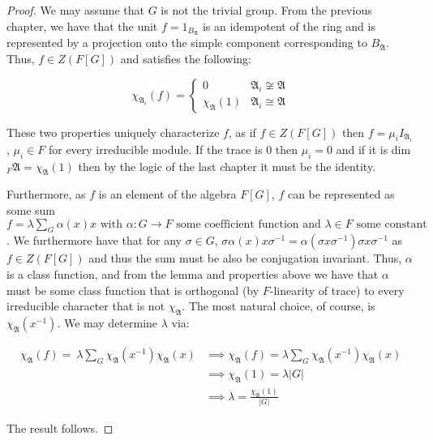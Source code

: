 \documentclass{article}
\begin{document}
\begin{proof}

  We may assume that $G$ is not the trivial group. From the previous chapter, we have that the unit $f = 1_{B_{\mathfrak{A}}}$ is an idempotent of the ring and is represented by a projection onto the simple component corresponding to $B_\mathfrak{A}$. Thus, $f \in Z(F[G])$ and satisfies the following:
  
  \[
    \chi_{\mathfrak{A}_{i}}(f) = \begin{cases} 0 & \mathfrak{A}_{i} \not\cong \mathfrak{A} \\ \chi_{\mathfrak{A}}(1) & \mathfrak{A}_{i} \cong \mathfrak{A} \end{cases}
  \]

  These two properties uniquely characterize $f$, as if $f \in Z(F[G])$ then $f = \mu_{i} I_{\mathfrak{A}_{i}}$, $\mu_{i} \in F$ for every irreducible module. If the trace is 0 then $\mu_{i}= 0$ and if it is dim$_{F}\mathfrak{A} = \chi_{\mathfrak{A}}(1)$ then by the logic of the last chapter it must be the identity.

  Furthermore, as $f$ is an element of the algebra $F[G]$, $f$ can be represented as some sum $ f = \lambda \sum_{G}\alpha(x)x \text{ with } \alpha: G \to F\text{ some coefficient function and } \lambda \in F\text{ some constant}$. We furthermore have that for any $\sigma \in G$, $\sigma \alpha(x)x \sigma^{-1} = \alpha(\sigma x \sigma^{-1}) \sigma x \sigma^{-1}$ as $f \in Z(F[G])$ and thus the sum must be also be conjugation invariant. Thus, $\alpha$ is a class function, and from the lemma and properties above we have that $\alpha$ must be some class function that is orthogonal (by $F$-linearity of trace) to every irreducible character that is not $\chi_{\mathfrak{A}}$. The most natural choice, of course, is $\chi_{\mathfrak{A}}(x^{-1})$.  We may determine $\lambda$ via:

  \begin{align*} \chi_{\mathfrak{A}}(f)  = \  \lambda \sum_{G} \chi_{\mathfrak{A}}(x^{-1})\chi_{\mathfrak{A}}(x) & \implies \chi_{\mathfrak{A}}(f)  =   \lambda \sum_{G} \chi_{\mathfrak{A}}(x^{-1})\chi_{\mathfrak{A}}(x) \\
  &\implies  \chi_{\mathfrak{A}}(1)  =   \lambda |G| \\
                                                                                                                 &\implies \lambda = \frac{\chi_{\mathfrak{A}}(1)}{|G|}
  \end{align*}

  The result follows.\end{proof}
\end{document}
